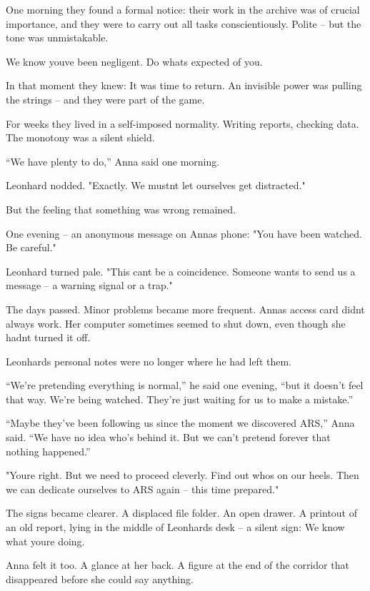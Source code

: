 \documentclass[
]{article}
\begin{document}
One morning they found a formal notice: their work in the archive was of crucial importance, and they were to carry out all tasks conscientiously. Polite -- but the tone was unmistakable.

We know you\textquotesingle ve been negligent. Do what\textquotesingle s expected of you.

In that moment they knew: It was time to return. An invisible power was pulling the strings -- and they were part of the game.

For weeks they lived in a self-imposed normality. Writing reports, checking data. The monotony was a silent shield.

``We have plenty to do,'' Anna said one morning.

Leonhard nodded. "Exactly. We mustn\textquotesingle t let ourselves get distracted."

But the feeling that something was wrong remained.

One evening -- an anonymous message on Anna\textquotesingle s phone: "You have been watched. Be careful."

Leonhard turned pale. "This can\textquotesingle t be a coincidence. Someone wants to send us a message -- a warning signal or a trap."

The days passed. Minor problems became more frequent. Anna\textquotesingle s access card didn\textquotesingle t always work. Her computer sometimes seemed to shut down, even though she hadn\textquotesingle t turned it off.

Leonhard\textquotesingle s personal notes were no longer where he had left them.

``We're pretending everything is normal,'' he said one evening, ``but it doesn't feel that way. We're being watched. They're just waiting for us to make a mistake.''

``Maybe they've been following us since the moment we discovered ARS,'' Anna said. ``We have no idea who's behind it. But we can't pretend forever that nothing happened.''

"You\textquotesingle re right. But we need to proceed cleverly. Find out who\textquotesingle s on our heels. Then we can dedicate ourselves to ARS again -- this time prepared."

The signs became clearer. A displaced file folder. An open drawer. A printout of an old report, lying in the middle of Leonhard\textquotesingle s desk -- a silent sign: We know what you\textquotesingle re doing.

Anna felt it too. A glance at her back. A figure at the end of the corridor that disappeared before she could say anything.
\end{document}
